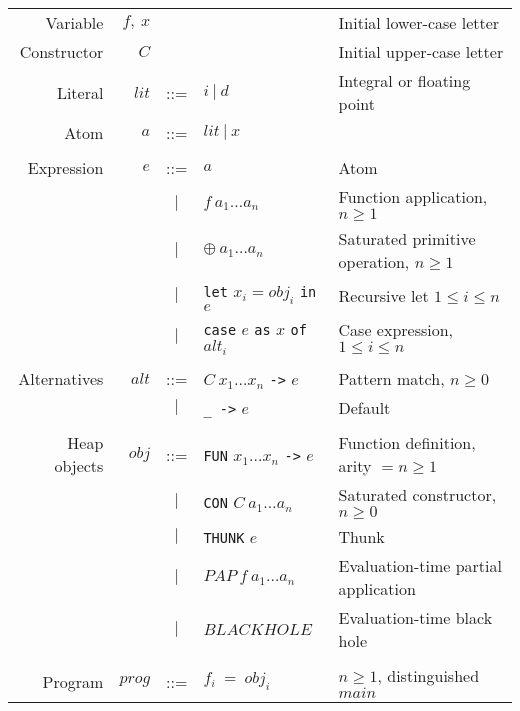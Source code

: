 \documentclass{llncs}
\begin{document}
\begin{table}
\footnotesize %
\centering
\begin{tabular}{r r c l l}

Variable     & $f,\ x$        &     &                                              & Initial lower-case letter \\
Constructor  & $C$            &     &                                              & Initial upper-case letter \\
Literal      & $\mathit{lit}$ & ::= & $i\ |\ d$                                    & Integral or floating point \\
Atom         & $a$            & ::= & $\mathit{lit}\ |\ x$                         & \\ %
\\
Expression   & $e$            & ::= & $a$                                          & Atom \\
             &                & $|$ & $f\ a_1\dots a_n$                            & Function application, $n\ge 1$ \\
             &                & $|$ & $\oplus\ a_1\dots a_n$                       & Saturated primitive operation, $n\ge 1$ \\
             &                & $|$ & \texttt{let} $x_i = \mathit{obj}_i$ 
                                         \texttt{in} $e$                           & Recursive let $1\le i \le n$\\
             &                & $|$ & \texttt{case} $e$ \texttt{as} 
                                        $x$ \texttt{of} $\mathit{alt}_i$           & Case expression, $1\le i \le n$\\
\\
Alternatives & $\mathit{alt}$ & ::= & $C\ x_1\dots x_n$ \texttt{->} $e$            & Pattern match, $n \ge 0$ \\
             &                & $|$ & \texttt{\_ ->} $e$                           & Default \\
\\
Heap objects & $\mathit{obj}$ & ::= &\texttt{FUN} $x_1\dots x_n$ \texttt{->} $e$   & Function definition, arity $=n\ge 1$ \\
             &                & $|$ &\texttt{CON} $C\ a_1\dots a_n$                & Saturated constructor, $n \ge 0$ \\
             &                & $|$ &\texttt{THUNK} $e$                            & Thunk \\
             &                & $|$ & $\mathit{PAP}\ f\ a_1\dots a_n$               & Evaluation-time partial application \\
             &                & $|$ & $\mathit{BLACKHOLE}$                         & Evaluation-time black hole \\
\\
Program      & $\mathit{prog}$& ::= & $f_i\ =\ \mathit{obj}_i$                      & $n\ge 1$, distinguished $\mathit{main}$ \\


\end{tabular}
\end{table}
\end{document}
